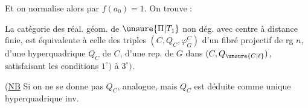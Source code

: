 
Et on normalise alors par $f(a_0)=1$. On trouve :

La catégorie des réal. géom. de $\unsure{\Pi|T_1}$ non dég. avec centre à distance finie, est équivalente à celle des triples $(C,Q_C,\varphi_G^C)$ d'un fibré projectif de rg $n$, d'une hyperquadrique $Q_C$ de $C$, d'une rep. de $G$ dans $(C,Q_{\unsure{C|\ell}})$, satisfaisant les conditions $1^\circ)$ à $3^\circ)$.


(\uline{NB} Si on ne se donne pas $Q_C$,  analogue, mais  $Q_C$ est déduite  comme unique hyperquadrique inv.
